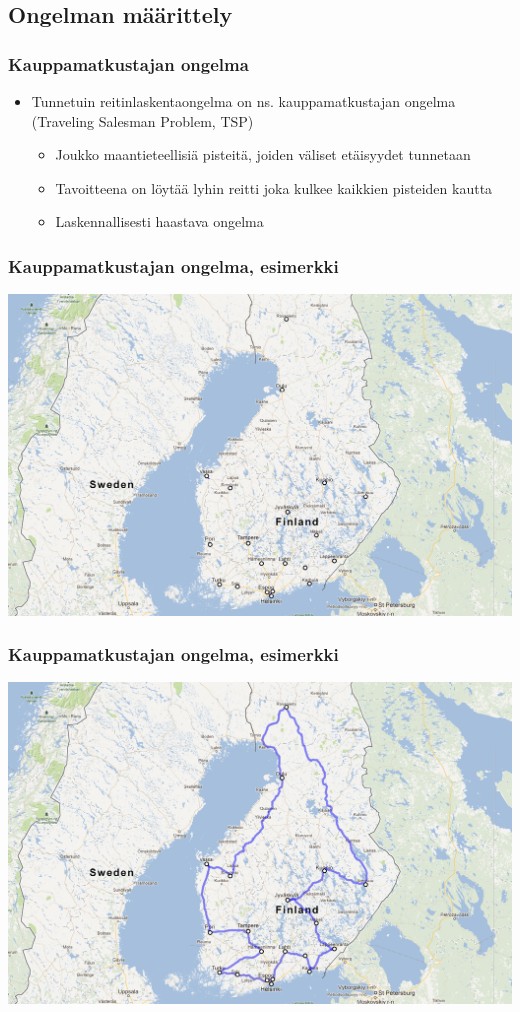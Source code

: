 \documentclass{beamer}
\begin{document}
\subsection{Ongelman määrittely}
\begin{frame}
  \frametitle{Kauppamatkustajan ongelma}   %
  \begin{itemize}
    \item 
Tunnetuin reitinlaskentaongelma on ns. kauppamatkustajan ongelma (Traveling Salesman Problem, TSP)
\begin{itemize}
\item
Joukko maantieteellisiä pisteitä, joiden väliset etäisyydet tunnetaan
\item
Tavoitteena on löytää lyhin reitti joka kulkee kaikkien pisteiden kautta
\item
Laskennallisesti haastava ongelma
    \end{itemize}
    \end{itemize}
    \end{frame}

    
    \begin{frame}
  \frametitle{Kauppamatkustajan ongelma, esimerkki}   %
\centering
\includegraphics[scale=0.25]{tspdemo01}
    \end{frame}
    
        \begin{frame}
  \frametitle{Kauppamatkustajan ongelma, esimerkki}   %
\centering
\includegraphics[scale=0.25]{tspdemo02}
    \end{frame}
    
\end{document}

